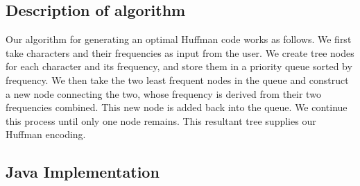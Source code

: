 \documentclass[11pt]{article}
\begin{document}
\subsection*{Description of algorithm}

Our algorithm for generating an optimal Huffman code works as follows. We first take characters and their frequencies as input from the user. We create tree nodes for each character and its frequency, and store them in a priority queue sorted by frequency. We then take the two least frequent nodes in the queue and construct a new node connecting the two, whose frequency is derived from their two frequencies combined. This new node is added back into the queue. We continue this process until only one node remains. This resultant tree supplies our Huffman encoding.

\subsection*{Java Implementation}
\end{document}
